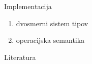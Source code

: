 \documentclass{beamer}
\theoremstyle{definition} %
\theoremstyle{plain} %
\begin{document}
	
	
	
	\begin{frame}{Implementacija}
		\begin{enumerate}
			\item dvosmerni sistem tipov
			\item operacijska semantika
		\end{enumerate}
	\end{frame}
	
	
	
	
	\begin{frame}{Literatura}
		
		
		
		
	\end{frame}
	
	
\end{document}
